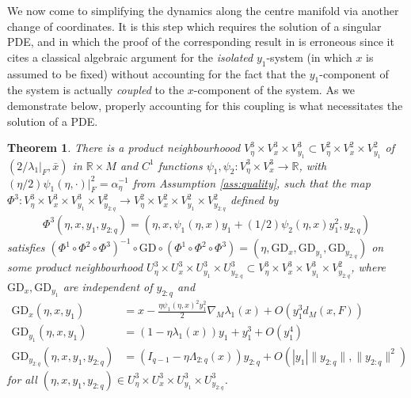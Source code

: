 \documentclass{article}
\newcommand{\RB}{\mathbb{R}}
\newcommand{\GD}{\mathrm{GD}}
\theoremstyle{plain}
\newtheorem{theorem}{Theorem}[section]
\theoremstyle{definition}
\theoremstyle{remark}
\begin{document}
We now come to simplifying the dynamics along the centre manifold via another change of coordinates. It is this step which requires the solution of a singular PDE, and in which the proof of the corresponding result in \cite{macdonaldeos} is erroneous since it cites a classical algebraic argument for the \emph{isolated} $y_1$-system \cite[Theorem 4.3]{kuznetsov} (in which $x$ is assumed to be fixed) without accounting for the fact that the $y_1$-component of the system is actually \emph{coupled} to the $x$-component of the system. As we demonstrate below, properly accounting for this coupling is what necessitates the solution of a PDE.

\begin{theorem}\label{thm:normalformappendix}
    There is a product neighbourhoood $V^3_{\eta}\times V^3_x\times V^3_{y_1}\subset V^2_{\eta}\times V^2_x\times V^2_{y_1}$ of $(2/\lambda_1|_F,\bar{x})$ in $\RB\times M$ and $C^1$ functions $\psi_1,\psi_2:V^3_{\eta}\times V^3_x\rightarrow\RB$, with $(\eta/2)\psi_1(\eta,\cdot)|_F^2 = \alpha_{\eta}^{-1}$ from Assumption \ref{ass:quality}, such that the map $\Phi^3:V^3_{\eta}\times V^3_x\times V^3_{y_1}\times V^2_{y_{2:q}}\rightarrow V^2_{\eta}\times V^2_{x}\times V^2_{y_1}\times V^2_{y_{2:q}}$ defined by
    \begin{align}
    \Phi^3(\eta,x,y_1,y_{2:q}) = (\eta,x,\psi_1(\eta,x)y_1 + (1/2)\psi_2(\eta,x)y_1^2,y_{2:q})
    \end{align}
    satisfies $(\Phi^1\circ\Phi^2\circ\Phi^3)^{-1}\circ\GD\circ(\Phi^1\circ\Phi^2\circ\Phi^3) = (\eta,\GD_x,\GD_{y_1},\GD_{y_{2:q}})$ on some product neighbourhood $U^3_{\eta}\times U^3_x\times U^3_{y_1}\times U^3_{y_{2:q}}\subset V^3_{\eta}\times V^3_x\times V^3_{y_1}\times V^2_{y_{2:q}}$, where $\GD_x,\GD_{y_1}$ are independent of $y_{2:q}$ and
    \begin{align}
    \GD_x(\eta,x,y_1) &= x-\frac{\eta\psi_1(\eta,x)^2y_1^2}{2}\nabla_M\lambda_1(x) + O(y_1^3d_M(x,F))\\\GD_{y_1}(\eta,x,y_1) &= (1-\eta\lambda_1(x))y_1+ y_1^3 + O(y_1^4)\\\GD_{y_{2:q}}(\eta,x,y_1,y_{2:q})&= (I_{q-1}-\eta\Lambda_{2:q}(x))y_{2:q} + O(|y_1|\|y_{2:q}\|,\|y_{2:q}\|^2)
    \end{align}
    for all $(\eta,x,y_1,y_{2:q})\in U^3_{\eta}\times U^3_x\times U^3_{y_1}\times U^3_{y_{2:q}}$.
\end{theorem}
\end{document}

